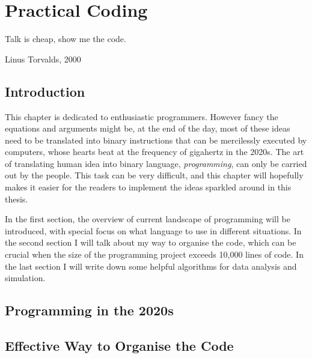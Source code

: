 \documentclass[11pt,twoside]{report}
\begin{document}
\chapter{Practical Coding}
\label{chapter:algorithms}

\epigraph{Talk is cheap, show me the code.}{Linus Torvalds, 2000}

\section{Introduction}

This chapter is dedicated to enthusiastic programmers. However fancy the equations and arguments might be, at the end of the day, most of these ideas need to be translated into binary instructions that can be mercilessly executed by computers, whose hearts beat at the frequency of gigahertz in the 2020s. The art of translating human idea into binary language, \emph{programming}, can only be carried out by the people. This task can be very difficult, and this chapter will hopefully makes it easier for the readers to implement the ideas sparkled around in this thesis.

In the first section, the overview of current landscape of programming will be introduced, with special focus on what language to use in different situations. In the second section I will talk about my way to organise the code, which can be crucial when the size of the programming project exceeds 10,000 lines of code. In the last section I will write down some helpful algorithms for data analysis and simulation.

\section{Programming in the 2020s}

\section{Effective Way to Organise the Code}
\end{document}
